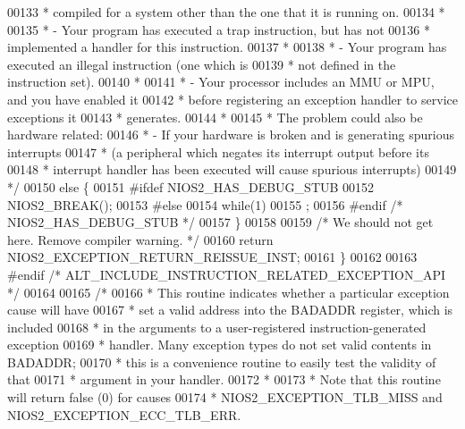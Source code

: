 \begin{DoxyCode}
00133 \textcolor{comment}{   *    compiled for a system other than the one that it is running on.}
00134 \textcolor{comment}{   *}
00135 \textcolor{comment}{   *  - Your program has executed a trap instruction, but has not}
00136 \textcolor{comment}{   *    implemented a handler for this instruction.}
00137 \textcolor{comment}{   *}
00138 \textcolor{comment}{   *  - Your program has executed an illegal instruction (one which is}
00139 \textcolor{comment}{   *    not defined in the instruction set).}
00140 \textcolor{comment}{   *}
00141 \textcolor{comment}{   *  - Your processor includes an MMU or MPU, and you have enabled it}
00142 \textcolor{comment}{   *    before registering an exception handler to service exceptions it}
00143 \textcolor{comment}{   *    generates.}
00144 \textcolor{comment}{   *}
00145 \textcolor{comment}{   * The problem could also be hardware related:}
00146 \textcolor{comment}{   *  - If your hardware is broken and is generating spurious interrupts}
00147 \textcolor{comment}{   *    (a peripheral which negates its interrupt output before its}
00148 \textcolor{comment}{   *    interrupt handler has been executed will cause spurious interrupts)}
00149 \textcolor{comment}{   */}
00150   \textcolor{keywordflow}{else} \{
00151 \textcolor{preprocessor}{#ifdef NIOS2\_HAS\_DEBUG\_STUB}
00152     NIOS2_BREAK();
00153 \textcolor{preprocessor}{#else}
00154     \textcolor{keywordflow}{while}(1)
00155       ;
00156 \textcolor{preprocessor}{#endif }\textcolor{comment}{/* NIOS2\_HAS\_DEBUG\_STUB */}\textcolor{preprocessor}{}
00157   \}
00158 
00159   \textcolor{comment}{/* We should not get here. Remove compiler warning. */}
00160   \textcolor{keywordflow}{return} NIOS2_EXCEPTION_RETURN_REISSUE_INST;
00161 \}
00162 
00163 \textcolor{preprocessor}{#endif }\textcolor{comment}{/* ALT\_INCLUDE\_INSTRUCTION\_RELATED\_EXCEPTION\_API */}\textcolor{preprocessor}{}
00164 
00165 \textcolor{comment}{/*}
00166 \textcolor{comment}{ * This routine indicates whether a particular exception cause will have}
00167 \textcolor{comment}{ * set a valid address into the BADADDR register, which is included}
00168 \textcolor{comment}{ * in the arguments to a user-registered instruction-generated exception}
00169 \textcolor{comment}{ * handler. Many exception types do not set valid contents in BADADDR;}
00170 \textcolor{comment}{ * this is a convenience routine to easily test the validity of that}
00171 \textcolor{comment}{ * argument in your handler.}
00172 \textcolor{comment}{ *}
00173 \textcolor{comment}{ * Note that this routine will return false (0) for causes }
00174 \textcolor{comment}{ * NIOS2\_EXCEPTION\_TLB\_MISS and NIOS2\_EXCEPTION\_ECC\_TLB\_ERR.}

\end{DoxyCode}
